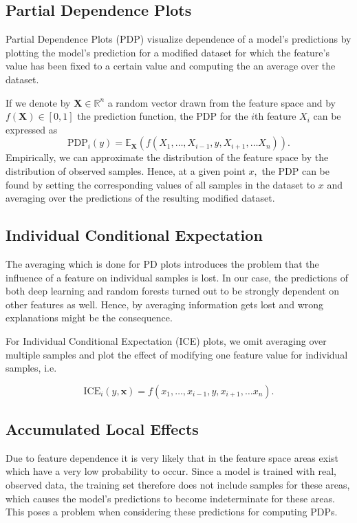 \documentclass[sigconf,nonacm]{acmart}
\begin{document}
\subsection{Partial Dependence Plots}
Partial Dependence Plots (PDP) visualize dependence of a model's predictions by plotting the model's prediction for a modified dataset for which the feature's value has been fixed to a certain value and computing the an average over the dataset.

If we denote by $\boldsymbol X \in \mathbb R ^n$ a random vector drawn from the feature space and by $f(\boldsymbol X) \in [0,1]$ the  prediction function, the PDP for the $i$th feature $X_i$ can be expressed as
\begin{equation}
\text{PDP}_i(y) = \mathbb E_{\boldsymbol X}\left(f(X_1,\ldots,X_{i-1},y,X_{i+1},\ldots X_n)\right) . %
\end{equation}
Empirically, we can approximate the distribution of the feature space by the distribution of observed samples. Hence, at a given point $x,$ the PDP can be found by setting the corresponding values of all samples in the dataset to $x$ and averaging over the predictions of the resulting modified dataset.

\subsection{Individual Conditional Expectation}
The averaging which is done for PD plots introduces the problem that the influence of a feature on individual samples is lost. In our case, the predictions of both deep learning and random forests turned out to be strongly dependent on other features as well. Hence, by averaging information gets lost and wrong explanations might be the consequence.

For Individual Conditional Expectation (ICE) plots, we omit averaging over multiple samples and plot the effect of modifying one feature value for  individual samples, i.e.

\begin{equation}
\text{ICE}_i(y, \boldsymbol x) = f(x_1,\ldots,x_{i-1},y,x_{i+1},\ldots x_n).
\end{equation}

\subsection{Accumulated Local Effects}
Due to feature dependence it is very likely that in the feature space areas exist which have a very low probability to occur. Since a model is trained with real, observed data, the training set therefore does not include samples for these areas, which causes the model's predictions to become indeterminate for these areas. This poses a problem when considering these predictions for computing PDPs. 
\end{document}
